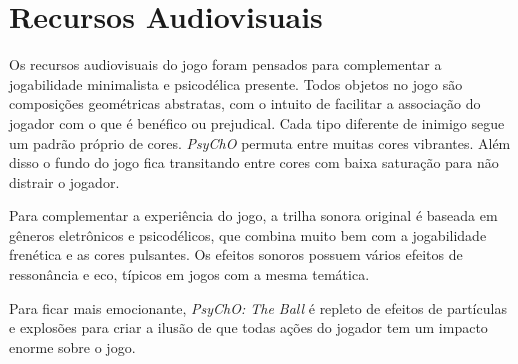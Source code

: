 \section{Recursos Audiovisuais}
\label{sec:audio_visuais}

Os recursos audiovisuais do jogo foram pensados para complementar a jogabilidade minimalista e psicodélica presente. Todos objetos no jogo são composições geométricas abstratas, com o intuito de facilitar a associação do jogador com o que é benéfico ou prejudical. Cada tipo diferente de inimigo segue um padrão próprio de cores. \textit{PsyChO} permuta entre muitas cores vibrantes. Além disso o fundo do jogo fica transitando entre cores com baixa saturação para não distrair o jogador.

Para complementar a experiência do jogo, a trilha sonora original é baseada em gêneros eletrônicos e psicodélicos, que combina muito bem com a jogabilidade frenética e as cores pulsantes. Os efeitos sonoros possuem vários efeitos de ressonância e eco, típicos em jogos com a mesma temática.

Para ficar mais emocionante, \textit{PsyChO: The Ball} é repleto de efeitos de partículas e explosões para criar a ilusão de que todas ações do jogador tem um impacto enorme sobre o jogo.
